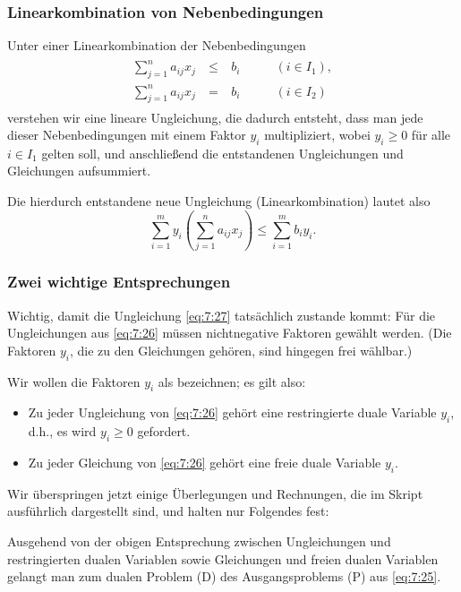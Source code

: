 \documentclass[smaller]{beamer}
\begin{document}
\begin{frame}
 \frametitle{Linearkombination von Nebenbedingungen}
 Unter einer \alert{Linearkombination der Nebenbedingungen}
\begin{align}
\begin{alignedat}{3}
\label{eq:7:26}
\sum\limits_{j=1}^{n}{a_{ij}x_j} &\ \leq &\ b_i & \qquad (i \in I_1), \\
\sum\limits_{j=1}^{n}{a_{ij}x_j} &\    = &\ b_i & \qquad (i \in I_2)
\end{alignedat}
\end{align}
verstehen wir eine lineare Ungleichung, die dadurch entsteht, dass man jede dieser Nebenbedingungen mit einem Faktor $y_i$ multipliziert, wobei $y_i \geq 0$ für alle $i \in I_1$ gelten soll, und anschließend die entstandenen Ungleichungen und Gleichungen aufsummiert. \\ \vspace*{0.2cm}

Die hierdurch entstandene neue Ungleichung (Linearkombination) lautet also
\begin{equation}
\label{eq:7:27}
\sum\limits_{i=1}^{m}{y_i \left( \sum\limits_{j=1}^{n}{a_{ij}x_j} \right)} \leq \sum\limits_{i=1}^{m}{b_iy_i}.
\end{equation} 
\end{frame}

\begin{frame}
 \frametitle{Zwei wichtige Entsprechungen}
 \alert{Wichtig, damit die Ungleichung \eqref{eq:7:27} tatsächlich zustande kommt}: Für die Ungleichungen aus \eqref{eq:7:26} müssen nichtnegative Faktoren gewählt werden. (Die Faktoren $y_i$, die zu den Gleichungen gehören, sind hingegen frei wählbar.)

Wir wollen die Faktoren $y_i$ als  bezeichnen; es gilt also:
\begin{itemize}
\item Zu jeder \alert{Ungleichung} von \eqref{eq:7:26} gehört eine \alert{restringierte duale Variable} $y_i$, d.h., es wird $y_i \geq 0$ gefordert.
\item Zu jeder \alert{Gleichung} von \eqref{eq:7:26} gehört eine \alert{freie duale Variable} $y_i$.
\end{itemize}
Wir überspringen jetzt einige Überlegungen und Rechnungen, die im Skript ausführlich dargestellt sind, und halten nur Folgendes fest: \\ \vspace*{0.2cm}

Ausgehend von der obigen Entsprechung zwischen Ungleichungen und restringierten dualen Variablen sowie Gleichungen und freien dualen Variablen gelangt man zum dualen Problem (D) des Ausgangsproblems (P) aus \eqref{eq:7:25}.
\end{frame}
\end{document}
